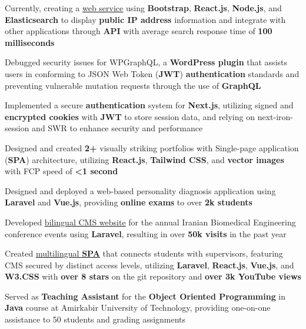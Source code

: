 \documentclass[10pt,A4]{article}
\newcommand{\cvlist}[1] {
  \begin{itemize}\small{#1}\end{itemize}
}
\begin{document}
\begin{paracol}{2}
\begin{rightcolumn}
{\cvlist{
         \item{
                Currently, creating a \href{https:\\publicipinfo.com}{\underline{web service}} using \textbf{Bootstrap}, \textbf{React.js}, \textbf{Node.js}, and \textbf{Elasticsearch} to display \textbf{public IP address} information and integrate with other applications through \textbf{API} with average search response time of \textbf{100 milliseconds}
          }
          \item{
                Debugged security issues for WPGraphQL, a \textbf{WordPress plugin} that assists users in conforming to JSON Web Token (\textbf{JWT}) \textbf{authentication} standards and preventing vulnerable mutation requests through the use of \textbf{GraphQL}
          }\item{
               Implemented a secure \textbf{authentication} system for \textbf{Next.js}, utilizing signed and \textbf{encrypted cookies} with \textbf{JWT} to store session data, and relying on next-iron-session and SWR to enhance security and performance
          }\item{
                Designed and created \textbf{2+} visually striking portfolios with Single-page application (\textbf{SPA}) architecture, utilizing \textbf{React.js}, \textbf{Tailwind CSS}, and \textbf{vector images} with FCP speed of \textbf{<1 second}
          }\item{
              Designed and deployed a web-based personality diagnosis application using \textbf{Laravel} and \textbf{Vue.js}, providing \textbf{online exams} to over \textbf{2k students}
          }
          \item{
                Developed \href{https://icbme.ir/}{\underline{bilingual CMS website}} for the annual Iranian Biomedical Engineering conference events using \textbf{Laravel}, resulting in over \textbf{50k visits} in the past year
          }\item{
                Created \href{https://github.com/majhoolsoft/Ultimate-CMS-for-laboratory-webpage}{\underline{multilingual \textbf{SPA}}} that connects students with supervisors, featuring CMS secured by distinct access levels, utilizing \textbf{Laravel}, \textbf{React.js}, \textbf{Vue.js}, and \textbf{W3.CSS} with \textbf{over 8 stars} on the git repository and \textbf{over 3k YouTube views}
          }
          \item{
              Served as \textbf{Teaching Assistant} for the \textbf{Object Oriented Programming} in \textbf{Java} course at Amirkabir University of Technology, providing one-on-one assistance to 50 students and grading assignments
          }
    }
}
\end{rightcolumn}
\end{paracol}
\end{document}
